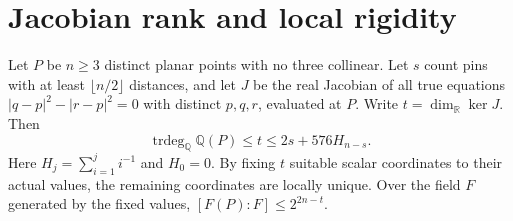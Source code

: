 \section{Jacobian rank and local rigidity}

\begin{theorem}[982-J01, 982-J02, 982-J03]
Let \(P\) be \(n\ge3\) distinct planar points with no three collinear. Let \(s\)
count pins with at least \(\lfloor n/2\rfloor\) distances, and let \(J\) be the real
Jacobian of all true equations \(|q-p|^2-|r-p|^2=0\) with distinct \(p,q,r\), evaluated
at \(P\). Write \(t=\dim_{\mathbb R}\ker J\). Then
\[
 \operatorname{trdeg}_{\mathbb Q}\mathbb Q(P)\le t\le 2s+576H_{n-s}.
\]
Here \(H_j=\sum_{i=1}^j i^{-1}\) and \(H_0=0\). By fixing \(t\) suitable scalar
coordinates to their actual values, the remaining coordinates are locally
unique. Over the field \(F\) generated by the fixed values,
\([F(P):F]\le 2^{2n-t}\).
\end{theorem}

